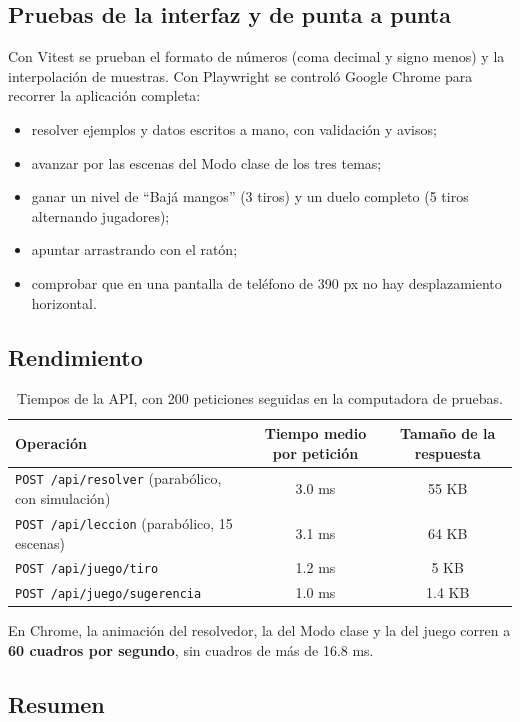 \documentclass[11pt,letterpaper]{article}
\begin{document}
\subsection{Pruebas de la interfaz y de punta a punta}

Con Vitest se prueban el formato de números (coma decimal y signo menos) y la interpolación de muestras. Con Playwright se controló Google Chrome para recorrer la aplicación completa:
\begin{itemize}
  \item resolver ejemplos y datos escritos a mano, con validación y avisos;
  \item avanzar por las escenas del Modo clase de los tres temas;
  \item ganar un nivel de ``Bajá mangos'' (3 tiros) y un duelo completo (5 tiros alternando jugadores);
  \item apuntar arrastrando con el ratón;
  \item comprobar que en una pantalla de teléfono de 390 px no hay desplazamiento horizontal.
\end{itemize}

\subsection{Rendimiento}

\begin{table}[H]
\centering
\small
\begin{tabular}{@{}lcc@{}}
\toprule
\textbf{Operación} & \textbf{Tiempo medio por petición} & \textbf{Tamaño de la respuesta} \\
\midrule
\texttt{POST /api/resolver} (parabólico, con simulación) & 3.0 ms & 55 KB \\
\texttt{POST /api/leccion} (parabólico, 15 escenas) & 3.1 ms & 64 KB \\
\texttt{POST /api/juego/tiro} & 1.2 ms & 5 KB \\
\texttt{POST /api/juego/sugerencia} & 1.0 ms & 1.4 KB \\
\bottomrule
\end{tabular}
\caption{Tiempos de la API, con 200 peticiones seguidas en la computadora de pruebas.}
\end{table}

En Chrome, la animación del resolvedor, la del Modo clase y la del juego corren a \textbf{60 cuadros por segundo}, sin cuadros de más de 16.8 ms.

\subsection{Resumen}
\end{document}
